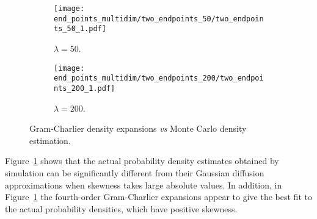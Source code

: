 \documentclass[12pt]{article}
\numberwithin{equation}{section}
\begin{document}
\begin{figure}[H]
\centering
\begin{subfigure}{.5\textwidth}
\centering
\texttt{[image: end\_points\_multidim/two\_endpoints\_50/two\_endpoints\_50\_1.pdf]} 
\caption{\small $\lambda = 50$.} 
\end{subfigure}
\hskip-0.2cm
\begin{subfigure}{.5\textwidth}
\centering
\texttt{[image: end\_points\_multidim/two\_endpoints\_200/two\_endpoints\_200\_1.pdf]} 
\caption{\small $\lambda = 200$.} 
\end{subfigure}
\caption{\small Gram-Charlier density expansions {\em vs} Monte Carlo density estimation.} 
\label{fig5}
\end{figure}

\vspace{-0.3cm}

\noindent
Figure~\ref{fig5} shows that
the actual probability density estimates obtained by simulation 
can be significantly different from
their Gaussian diffusion approximations when 
skewness takes large absolute values. 
In addition, in Figure~\ref{fig5} 
the fourth-order Gram-Charlier expansions appear to give the best fit
to the actual probability densities, 
which have positive skewness. 
\end{document}
